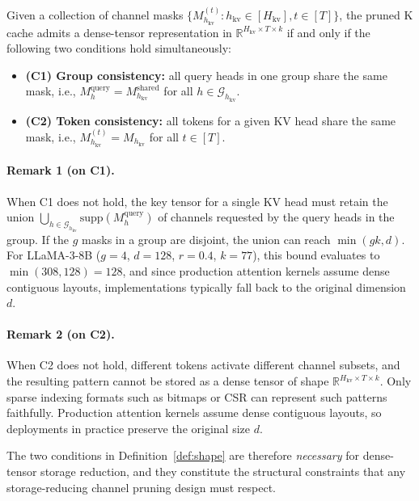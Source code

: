 \documentclass{article}
\begin{document}
\begin{definition}
\label{def:shape}
Given a collection of channel masks $\{M_{h_{\mathrm{kv}}}^{(t)} : h_{\mathrm{kv}} \in [H_{\mathrm{kv}}], t \in [T]\}$, the pruned K cache admits a dense-tensor representation in $\mathbb{R}^{H_{\mathrm{kv}} \times T \times k}$ if and only if the following two conditions hold simultaneously:
\begin{itemize}
    \item \textbf{(C1) Group consistency:} all query heads in one group share the same mask, i.e., $M_{h}^{\mathrm{query}} = M_{h_{\mathrm{kv}}}^{\mathrm{shared}}$ for all $h \in \mathcal{G}_{h_{\mathrm{kv}}}$.
    \item \textbf{(C2) Token consistency:} all tokens for a given KV head share the same mask, i.e., $M_{h_{\mathrm{kv}}}^{(t)} = M_{h_{\mathrm{kv}}}$ for all $t \in [T]$.
\end{itemize}
\end{definition}
 
\paragraph{Remark 1 (on C1).} When C1 does not hold, the key tensor for a single KV head must retain the union $\bigcup_{h \in \mathcal{G}_{h_{\mathrm{kv}}}} \mathrm{supp}(M_h^{\mathrm{query}})$ of channels requested by the query heads in the group. If the $g$ masks in a group are disjoint, the union can reach $\min(gk, d)$. For LLaMA-3-8B ($g=4$, $d=128$, $r=0.4$, $k=77$), this bound evaluates to $\min(308, 128) = 128$, and since production attention kernels assume dense contiguous layouts, implementations typically fall back to the original dimension $d$.
 
\paragraph{Remark 2 (on C2).} When C2 does not hold, different tokens activate different channel subsets, and the resulting pattern cannot be stored as a dense tensor of shape $\mathbb{R}^{H_{\mathrm{kv}} \times T \times k}$. Only sparse indexing formats such as bitmaps or CSR can represent such patterns faithfully. Production attention kernels assume dense contiguous layouts, so deployments in practice preserve the original size $d$.
 
The two conditions in Definition~\ref{def:shape} are therefore \emph{necessary} for dense-tensor storage reduction, and they constitute the structural constraints that any storage-reducing channel pruning design must respect.
 
\end{document}
